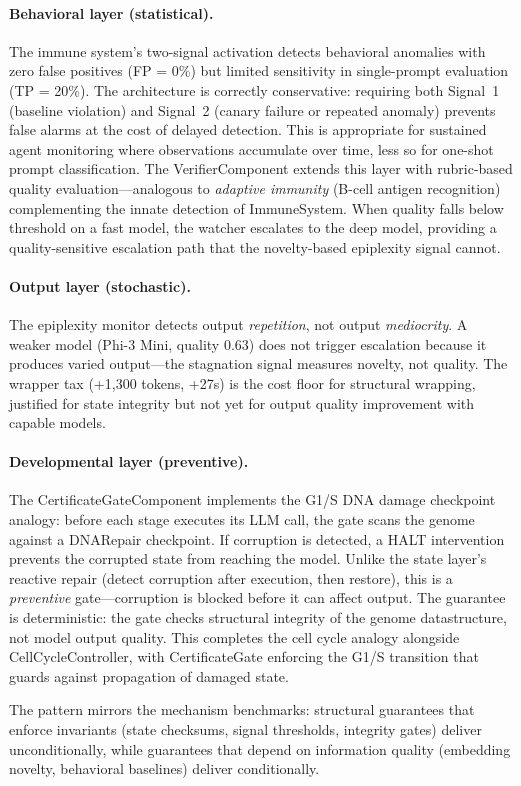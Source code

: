 \paragraph{Behavioral layer (statistical).}
The immune system's two-signal activation detects behavioral anomalies
with zero false positives (FP = 0\%) but limited sensitivity in
single-prompt evaluation (TP = 20\%).  The architecture is correctly
conservative: requiring both Signal~1 (baseline violation) and
Signal~2 (canary failure or repeated anomaly) prevents false alarms
at the cost of delayed detection.  This is appropriate for sustained
agent monitoring where observations accumulate over time, less so for
one-shot prompt classification.  The VerifierComponent extends this
layer with rubric-based quality evaluation---analogous to \emph{adaptive
immunity} (B-cell antigen recognition) complementing the innate
detection of ImmuneSystem.  When quality falls below threshold on a
fast model, the watcher escalates to the deep model, providing a
quality-sensitive escalation path that the novelty-based epiplexity
signal cannot.

\paragraph{Output layer (stochastic).}
The epiplexity monitor detects output \emph{repetition}, not output
\emph{mediocrity}.  A weaker model (Phi-3 Mini, quality 0.63) does
not trigger escalation because it produces varied output---the
stagnation signal measures novelty, not quality.  The wrapper tax
(+1{,}300 tokens, +27s) is the cost floor for structural wrapping,
justified for state integrity but not yet for output quality
improvement with capable models.

\paragraph{Developmental layer (preventive).}
The CertificateGateComponent implements the G1/S DNA damage checkpoint
analogy: before each stage executes its LLM call, the gate scans the
genome against a DNARepair checkpoint.  If corruption is detected, a
HALT intervention prevents the corrupted state from reaching the model.
Unlike the state layer's reactive repair (detect corruption after
execution, then restore), this is a \emph{preventive} gate---corruption
is blocked before it can affect output.  The guarantee is deterministic:
the gate checks structural integrity of the genome datastructure, not
model output quality.  This completes the cell cycle analogy alongside
CellCycleController, with CertificateGate enforcing the G1/S transition
that guards against propagation of damaged state.

The pattern mirrors the mechanism benchmarks: structural guarantees
that enforce invariants (state checksums, signal thresholds, integrity
gates) deliver unconditionally, while guarantees that depend on
information quality (embedding novelty, behavioral baselines) deliver
conditionally.
